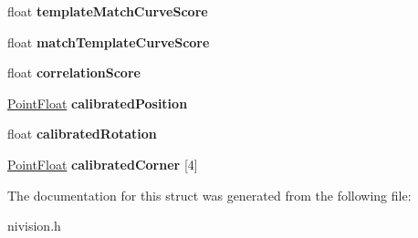 \begin{DoxyCompactItemize}
\item 
\hypertarget{structGeometricPatternMatch3__struct_aa6ec91fe7540cdd2008e11d9ebcfc93f}{
float {\bfseries templateMatchCurveScore}}
\label{structGeometricPatternMatch3__struct_aa6ec91fe7540cdd2008e11d9ebcfc93f}

\item 
\hypertarget{structGeometricPatternMatch3__struct_a4e1abb72a414f1dcd9866815806d42ff}{
float {\bfseries matchTemplateCurveScore}}
\label{structGeometricPatternMatch3__struct_a4e1abb72a414f1dcd9866815806d42ff}

\item 
\hypertarget{structGeometricPatternMatch3__struct_ac0988f184d63081bbec9e35a6e870989}{
float {\bfseries correlationScore}}
\label{structGeometricPatternMatch3__struct_ac0988f184d63081bbec9e35a6e870989}

\item 
\hypertarget{structGeometricPatternMatch3__struct_aa160a04ed0305e9ade1fd37544b60e4e}{
\hyperlink{structPointFloat__struct}{PointFloat} {\bfseries calibratedPosition}}
\label{structGeometricPatternMatch3__struct_aa160a04ed0305e9ade1fd37544b60e4e}

\item 
\hypertarget{structGeometricPatternMatch3__struct_ac5e96f7584eeb7d8300f85e3e0c32ba8}{
float {\bfseries calibratedRotation}}
\label{structGeometricPatternMatch3__struct_ac5e96f7584eeb7d8300f85e3e0c32ba8}

\item 
\hypertarget{structGeometricPatternMatch3__struct_a352fd2f4c5f235d622da1454f500d8bd}{
\hyperlink{structPointFloat__struct}{PointFloat} {\bfseries calibratedCorner} \mbox{[}4\mbox{]}}
\label{structGeometricPatternMatch3__struct_a352fd2f4c5f235d622da1454f500d8bd}

\end{DoxyCompactItemize}


The documentation for this struct was generated from the following file:\begin{DoxyCompactItemize}
\item 
nivision.h\end{DoxyCompactItemize}
